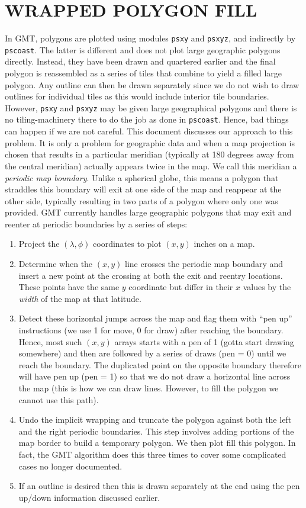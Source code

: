 \documentclass[12pt,letterpaper,margin=0.5in]{article}
\begin{document}
\section{WRAPPED POLYGON FILL}

In GMT, polygons are plotted using modules \texttt{psxy} and \texttt{psxyz}, and indirectly by \texttt{pscoast}.
The latter is different and does not plot large geographic polygons directly.  Instead, they have been drawn and
quartered earlier and the final polygon is reassembled as a series of tiles that combine to yield a filled large
polygon.  Any outline can then be drawn separately since we do not wish to draw outlines for individual tiles as
this would include interior tile boundaries.  However, \texttt{psxy} and \texttt{psxyz} may be given large geographical
polygons and there is no tiling-machinery there to do the job as done in \texttt{pscoast}.  Hence, bad things
can happen if we are not careful.  This document discusses our approach to this problem.  It is only a problem
for geographic data and when a map projection is chosen that results in a particular meridian (typically at 180 degrees
away from the central meridian) actually appears twice in the map.  We call this meridian a \emph{periodic map boundary}.
Unlike a spherical globe, this means a polygon that straddles this boundary will exit at one side of the map and reappear
at the other side, typically resulting in two parts of a polygon where only one was provided.
GMT currently handles large geographic polygons that may exit and reenter at periodic boundaries by a series of steps:
\begin{enumerate}
	\item Project the $(\lambda, \phi)$ coordinates to plot $(x,y)$ inches on a map.
	\item Determine when the $(x,y)$ line crosses the periodic map boundary and insert a new point at the crossing at both the exit
		and reentry locations. These points have the same $y$ coordinate but differ in their $x$ values by the
		\emph{width} of the map at that latitude.
	\item Detect these horizontal jumps across the map and flag them with ``pen up'' instructions (we use 1 for move, 0 for draw)
		after reaching the boundary.  Hence, most such $(x,y)$ arrays starts with a pen of 1 (gotta start drawing somewhere)
		and then are followed by a series of draws (pen = 0) until we reach the boundary.  The duplicated point on the
		opposite boundary therefore will have pen up (pen = 1) so that we do not draw a horizontal line across the map (this
		is how we can draw lines. However, to fill the polygon we cannot use this path).
	\item Undo the implicit wrapping and truncate the polygon against both the left and the right periodic boundaries.
		This step involves adding portions of the map border to build a temporary polygon.  We then plot fill this polygon.
		In fact, the GMT algorithm does this three times to cover some complicated cases no longer documented.
	\item If an outline is desired then this is drawn separately at the end using the pen up/down information discussed earlier.
\end{enumerate}
\end{document}
